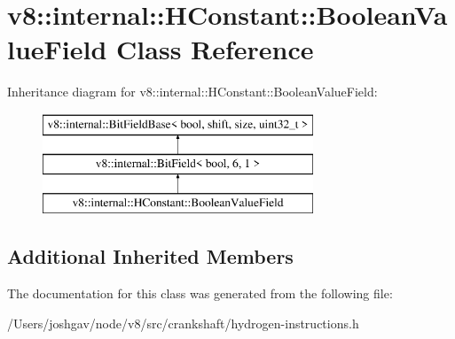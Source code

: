 \hypertarget{classv8_1_1internal_1_1_h_constant_1_1_boolean_value_field}{}\section{v8\+:\+:internal\+:\+:H\+Constant\+:\+:Boolean\+Value\+Field Class Reference}
\label{classv8_1_1internal_1_1_h_constant_1_1_boolean_value_field}
Inheritance diagram for v8\+:\+:internal\+:\+:H\+Constant\+:\+:Boolean\+Value\+Field\+:\begin{figure}[H]
\begin{center}
\leavevmode
\includegraphics[height=3.000000cm]{classv8_1_1internal_1_1_h_constant_1_1_boolean_value_field}
\end{center}
\end{figure}
\subsection*{Additional Inherited Members}


The documentation for this class was generated from the following file\+:\begin{DoxyCompactItemize}
\item 
/\+Users/joshgav/node/v8/src/crankshaft/hydrogen-\/instructions.\+h\end{DoxyCompactItemize}
